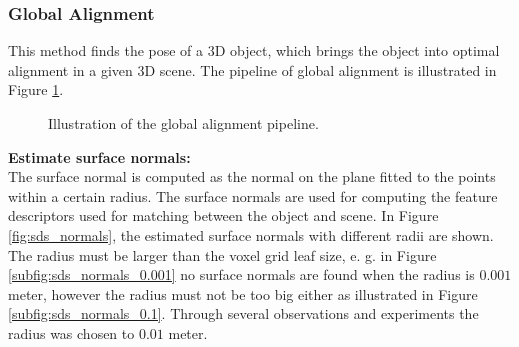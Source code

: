 \documentclass[../main.tex]{subfiles}
\begin{document}
\subsubsection{Global Alignment} \label{subsubsec:global_alignment}
This method finds the pose of a 3D object, which brings the object into optimal alignment in a given 3D scene. The pipeline of global alignment is illustrated in Figure \ref{fig:global_process}.
\begin{figure}[H]
    \centering
    \noindent\makebox[\textwidth][c]{}
    \caption{Illustration of the global alignment pipeline.}
    \label{fig:global_process}
\end{figure}
\textbf{Estimate surface normals:}\\
The surface normal is computed as the normal on the plane fitted to the points within a certain radius. The surface normals are used for computing the feature descriptors used for matching between the object and scene. In Figure \ref{fig:sds_normals}, the estimated surface normals with different radii are shown. The radius must be larger than the voxel grid leaf size, e. g. in Figure \ref{subfig:sds_normals_0.001} no surface normals are found when the radius is $0.001$ meter, however the radius must not be too big either as illustrated in Figure \ref{subfig:sds_normals_0.1}. Through several observations and experiments the radius was chosen to $0.01$ meter.
\end{document}
